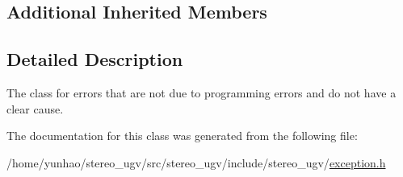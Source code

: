 \subsection*{Additional Inherited Members}


\subsection{Detailed Description}
The class for errors that are not due to programming errors and do not have a clear cause. 

The documentation for this class was generated from the following file\+:\begin{DoxyCompactItemize}
\item 
/home/yunhao/stereo\+\_\+ugv/src/stereo\+\_\+ugv/include/stereo\+\_\+ugv/\hyperlink{exception_8h}{exception.\+h}\end{DoxyCompactItemize}

